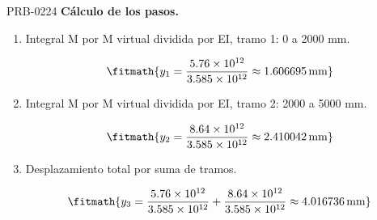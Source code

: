 \begin{studiumworked}{PRB-0224}
\textbf{Cálculo de los pasos.}

\begin{enumerate}

\item Integral M por M virtual dividida por EI, tramo 1: 0 a 2000 mm.

\[\fitmath{y_{1}=\frac{5.76\times10^{12}}{3.585\times10^{12}}\approx 1.606695\,\mathrm{mm}}\]

\item Integral M por M virtual dividida por EI, tramo 2: 2000 a 5000 mm.

\[\fitmath{y_{2}=\frac{8.64\times10^{12}}{3.585\times10^{12}}\approx 2.410042\,\mathrm{mm}}\]

\item Desplazamiento total por suma de tramos.

\[\fitmath{y_{3}=\frac{5.76\times10^{12}}{3.585\times10^{12}}+\frac{8.64\times10^{12}}{3.585\times10^{12}}\approx 4.016736\,\mathrm{mm}}\]

\end{enumerate}


\end{studiumworked}
